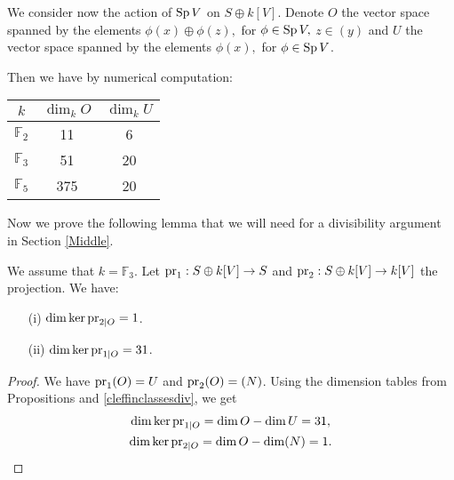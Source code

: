 We consider now the action of $\operatorname{Sp} V$ on $S\oplus k[V]$. 
Denote $O$ the vector space spanned by the elements $\phi(x)\oplus \phi(z),$ for $\phi \in \operatorname{Sp} V,$ $z \in (y)$
and $U$ the vector space spanned by the elements $\phi(x),$ for $\phi \in \operatorname{Sp} V$.
\begin{proposition}\label{CombinedSymplectic}
Then we have by numerical computation:
\vspace{2mm}
\begin{center}
\begin{tabular}{c||c|c}
 $k$ & $\dim_k O$  & $\dim_k U$\\
\hline
$\mathbb F_2$ & 11 & 6 \\
$\mathbb F_3$ & 51  & 20 \\
$\mathbb F_5$ & 375  & 20 
\end{tabular}
\end{center}
\end{proposition}
Now we prove the following lemma that we will need for a divisibility argument in Section \ref{Middle}.
\begin{lemme}\label{cleffinclassesdiv}
We assume that $k=\mathbb F_3$. Let $\operatorname{pr}_1: S\oplus k[V]\rightarrow S$ and $\operatorname{pr}_2: S\oplus k[V]\rightarrow k[V]$ the projection. 
We have: 
\begin{itemize}
\item[(i)]
$\dim \ker\operatorname{pr}_{2|O}=1$.
\item[(ii)]
$\dim \ker\operatorname{pr}_{1|O}=31$.
\end{itemize}
\end{lemme}
\begin{proof}
We have $\operatorname{pr}_{1}(O)=U$ and $\operatorname{pr}_{2}(O)=(N)$. Using the dimension tables from Propositions \label{CombinedSymplectic} and \ref{cleffinclassesdiv}, we get
\begin{gather*}
\dim \ker\operatorname{pr}_{1|O} = \dim O - \dim U  = 31,\\
\dim \ker\operatorname{pr}_{2|O} = \dim O - \dim (N) = 1.
\end{gather*}

\end{proof}